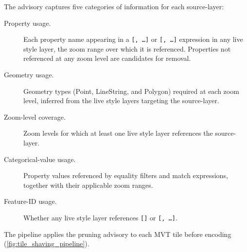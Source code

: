 \noindent The advisory captures five categories of information for each source-layer:

\begin{description}
	\item[Property usage.] Each property name appearing in a \texttt{[,~\ldots]} or \texttt{[,~\ldots]} expression in any live style layer, the zoom range over which it is referenced.
	Properties not referenced at any zoom level are candidates for removal.

	\item[Geometry usage.] Geometry types (Point, LineString, and
	Polygon) required at each zoom level, inferred from the live style layers
	targeting the source-layer.

	\item[Zoom-level coverage.] Zoom levels for which at least one live
	style layer references the source-layer.

	\item[Categorical-value usage.] Property values referenced by
	equality filters and match expressions, together with their applicable zoom
	ranges.

	\item[Feature-ID usage.] Whether any live style layer references
	\texttt{[]} or
	\texttt{[,~\ldots]}.

\end{description}

\noindent The pipeline applies the pruning advisory to each \ac{MVT} tile before encoding (\cref{fig:tile_shaving_pipeline}).

